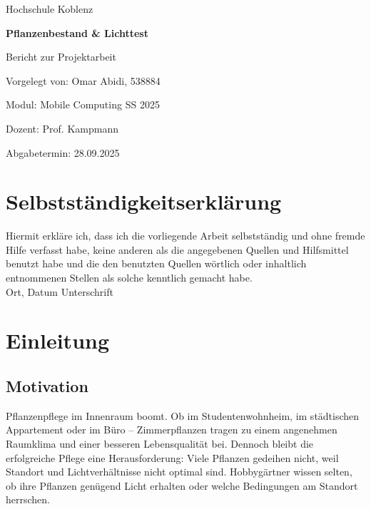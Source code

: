 \documentclass[14pt,a4paper]{report}
\begin{document}
\begin{titlepage}
    \centering
    {\Large Hochschule Koblenz \par}
    \vspace{3cm}
    {\Huge \textbf{Pflanzenbestand \& Lichttest} \par}
    \vspace{2cm}
    {\Large Bericht zur Projektarbeit \par}
    \vspace{3cm}
    {\large Vorgelegt von: Omar Abidi, 538884 \par}
    {\large Modul: Mobile Computing SS 2025 \par}
    {\large Dozent: Prof. Kampmann \par}
    \vfill
    {\large Abgabetermin: 28.09.2025 \par}
\end{titlepage}

\tableofcontents
\newpage


\chapter*{Selbstständigkeitserklärung}
Hiermit erkläre ich, dass ich die vorliegende Arbeit selbstständig und ohne fremde Hilfe verfasst habe, keine anderen als die angegebenen Quellen und Hilfsmittel benutzt habe und die den benutzten Quellen wörtlich oder inhaltlich entnommenen Stellen als solche kenntlich gemacht habe. \\[1cm]
Ort, Datum \hfill Unterschrift

\chapter{Einleitung}
\section{Motivation}
Pflanzenpflege im Innenraum boomt. Ob im Studentenwohnheim, im städtischen Appartement oder im Büro – Zimmerpflanzen tragen zu einem angenehmen Raumklima und einer besseren Lebensqualität bei. Dennoch bleibt die erfolgreiche Pflege eine Herausforderung: Viele Pflanzen gedeihen nicht, weil Standort und Lichtverhältnisse nicht optimal sind. Hobbygärtner wissen selten, ob ihre Pflanzen genügend Licht erhalten oder welche Bedingungen am Standort herrschen.
\end{document}
